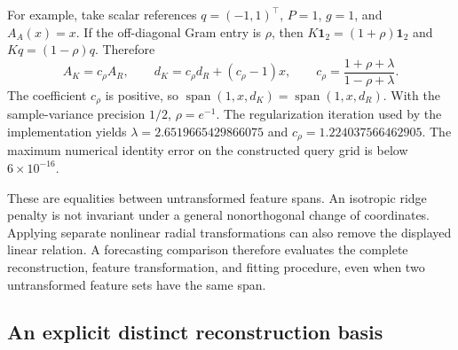 For example, take scalar references $q=(-1,1)^\top$, $P=1$, $g=1$,
and $A_A(x)=x$. If the off-diagonal Gram entry is $\rho$, then
$K\mathbf1_2=(1+\rho)\mathbf1_2$ and $Kq=(1-\rho)q$. Therefore
\begin{equation}
 A_K=c_\rho A_R,\qquad
 d_K=c_\rho d_R+(c_\rho-1)x,\qquad
 c_\rho=\frac{1+\rho+\lambda}{1-\rho+\lambda}.
 \label{eq:mechanism-two-reference}
\end{equation}
The coefficient $c_\rho$ is positive, so
$\operatorname{span}(1,x,d_K)=\operatorname{span}(1,x,d_R)$.
With the sample-variance precision $1/2$, $\rho=e^{-1}$.
The regularization iteration used by the implementation yields
$\lambda=2.6519665429866075$ and $c_\rho=1.224037566462905$.
The maximum numerical identity error on the constructed query grid is
below $6\times10^{-16}$.

These are equalities between untransformed feature spans. An isotropic
ridge penalty is not invariant under a general nonorthogonal change of
coordinates. Applying separate nonlinear radial transformations can also
remove the displayed linear relation. A forecasting comparison therefore
evaluates the complete reconstruction, feature transformation, and fitting
procedure, even when two untransformed feature sets have the same span.

\subsection{An explicit distinct reconstruction basis}

